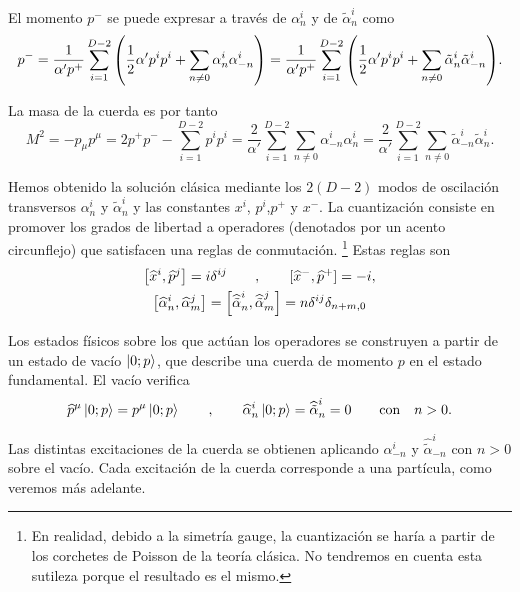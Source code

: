El momento $p^-$ se puede expresar a través de $\alpha^i_n$ y de $\tilde \alpha^i_n$ como
\begin{equation}
  p^- = \frac{1}{\alpha' p^+}\sum_{i=1}^{D-2} \qty(\frac{1}{2}\alpha'p^i p^i +\sum_{n\neq0}\alpha_n^i\alpha_{-n}^i) 
   = \frac{1}{\alpha' p^+}\sum_{i=1}^{D-2} \qty(\frac{1}{2}\alpha'p^i p^i +\sum_{n\neq0}\tilde \alpha_n^i\tilde \alpha_{-n}^i) .
\end{equation}

La masa de la cuerda es por tanto
\begin{equation}
  M^2=-p_\mu p^\mu = 2p^+p^- - \sum_{i=1}^{D-2} p^i p^i = 
  \frac{2}{\alpha'}\sum_{i=1}^{D-2} \sum_{n\neq 0} \alpha_{-n}^i \alpha_n^i
  =\frac{2}{\alpha'}\sum_{i=1}^{D-2} \sum_{n\neq 0}\tilde \alpha_{-n}^i \tilde\alpha_n^i.
  \label{eq:mass}
\end{equation}

Hemos obtenido la solución clásica mediante los $2(D-2)$ modos de oscilación transversos 
$\alpha^i_n$ y $\tilde \alpha_n^i$ y las constantes $x^i$, $p^i$,$p^+$ y $x^-$.
La cuantización consiste en promover los grados de libertad a operadores (denotados
por un acento circunflejo) que satisfacen una reglas de conmutación.
\footnote{En realidad, debido a la simetría gauge, la cuantización se haría a partir de los
corchetes de Poisson de la teoría clásica. No tendremos en cuenta esta sutileza porque el
resultado es el mismo.}
Estas reglas son
\begin{equation}
  \begin{gathered}
    \qty[\widehat x^i,\widehat p^j] = i\delta^{ij}\qquad , \qquad [\widehat x^-,\widehat p^+] = -i,\\
    \qty[\widehat \alpha_n^i,\widehat \alpha_m^j]= \qty[\widehat {\tilde \alpha}_n^i,\widehat {\tilde \alpha}_m^j]= n \delta^{ij}\delta_{n+m,0}
  \end{gathered}
\end{equation}

Los estados físicos sobre los que actúan los operadores se construyen a partir de un estado 
de vacío $\ket{0;p}$, que describe una cuerda de momento $p$ en el estado fundamental.
El vacío verifica
\begin{equation}
  \widehat p^\mu \ket{0;p} = p^\mu \ket{0;p} \qquad, \qquad \widehat \alpha^i_n\ket{0;p}=\widehat {\tilde\alpha}^i_n = 0 \qquad \text{con} \quad n>0.
\end{equation}

Las distintas excitaciones de la cuerda se obtienen aplicando $\alpha_{-n}^i$ y $\widehat{\tilde\alpha}_{-n}^i$
con $n>0$ sobre el vacío.
Cada excitación de la cuerda corresponde a una partícula, como veremos más adelante.

